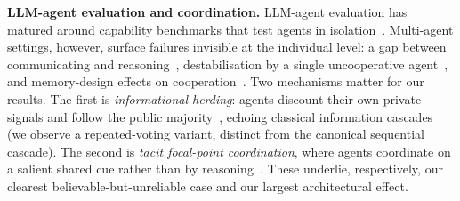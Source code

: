 \documentclass[runningheads]{llncs}
\begin{document}
\textbf{LLM-agent evaluation and coordination.} LLM-agent evaluation has matured around capability benchmarks that test agents in isolation~\cite{li2024agentbench,mohammadi2025evaluation}. Multi-agent settings, however, surface failures invisible at the individual level: a gap between communicating and reasoning~\cite{zhang2026silo}, destabilisation by a single uncooperative agent~\cite{kulshreshtha2026defection}, and memory-design effects on cooperation~\cite{hishiki2026memory}. Two mechanisms matter for our results. The first is \emph{informational herding}: agents discount their own private signals and follow the public majority~\cite{cho2025herd,jain2025social,zhong2025conformity}, echoing classical information cascades~\cite{bikhchandani1992theory} (we observe a repeated-voting variant, distinct from the canonical sequential cascade). The second is \emph{tacit focal-point coordination}, where agents coordinate on a salient shared cue rather than by reasoning~\cite{aharon2026tacit}. These underlie, respectively, our clearest believable-but-unreliable case and our largest architectural effect.
\end{document}
